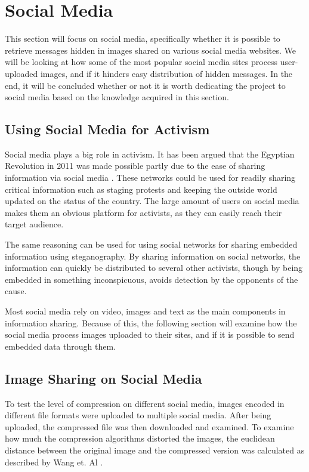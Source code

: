 \clearpage

\section{Social Media}
This section will focus on social media, specifically whether it is possible to retrieve messages hidden in images shared on various social media websites.
We will be looking at how some of the most popular social media sites process user-uploaded images, and if it hinders easy distribution of hidden messages.
In the end, it will be concluded whether or not it is worth dedicating the project to social media based on the knowledge acquired in this section.

\subsection{Using Social Media for Activism}
\label{sec:socialmedia}
Social media plays a big role in activism.
It has been argued that the Egyptian Revolution in 2011 was made possible partly due to the ease of sharing information via social media \citep{IJoC1242}.
These networks could be used for readily sharing critical information such as staging protests and keeping the outside world updated on the status of the country.
The large amount of users on social media makes them an obvious platform for activists, as they can easily reach their target audience.

The same reasoning can be used for using social networks for sharing embedded information using steganography.
By sharing information on social networks, the information can quickly be distributed to several other activists, though by being embedded in something inconspicuous, avoids detection by the opponents of the cause.

Most social media rely on video, images and text as the main components in information sharing.
Because of this, the following section will examine how the social media process images uploaded to their sites, and if it is possible to send embedded data through them.

\subsection{Image Sharing on Social Media}
To test the level of compression on different social media, images encoded in different file formats were uploaded to multiple social media.
After being uploaded, the compressed file was then downloaded and examined.
To examine how much the compression algorithms distorted the images, the euclidean distance between the original image and the compressed version was calculated as described by Wang et. Al \citep{Wang2005}.

